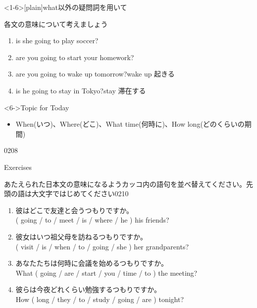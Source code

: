 \documentclass[aspectratio=169,xcolor={dvipsnames,table}]{beamer}
\newcommand{\liaison}{%
  \tikz[baseline=0pt] \draw (0,0) to[bend right=20] (0.2,0);%
}
\newcommand{\myaudio}[1]{\href{#1}{\faVolumeUp}}
\begin{document}
\begin{frame}<1-6>[plain]{what以外の疑問詞を用いて}

{\small 各文の意味について考えましょう}

\begin{enumerate}
 \item {} is she going to play soccer?
 \item {} are you going to start your homework?
 \item {} are you going to wake up tomorrow?\hfill{\scriptsize wake up \textipa{/w\'eIk\liaison \textturnv p/} 起きる}
 \item {} is he going to stay in Tokyo?\hfill{\scriptsize stay  滞在する}
\end{enumerate}

\begin{block}<6->{Topic for Today}
\small
\begin{itemize}[square]\small
 \item  When(いつ)、Where(どこ)、What time(何時に)、How long(どのくらいの期間)
\end{itemize}
      \end{block}
\hfill{\tiny 0208}\,{\scriptsize \myaudio{./audio/011_be_going_to_16.mp3}}
\end{frame}
\begin{frame}[plain]{Exercises}

{\small あたえられた日本文の意味になるようカッコ内の語句を並べ替えてください。先頭の語は大文字ではじめてください}\hfill{\tiny 0210}\,{\scriptsize \myaudio{./audio/011_be_going_to_16.mp3}}

 \begin{enumerate}
  \item {\small 彼はどこで友達と会うつもりですか。}\\
( going / to / meet / is / where / he ) his friends?\\
  \item {\small 彼女はいつ祖父母を訪ねるつもりですか。}\\
( visit / is / when / to / going / she ) her grandparents?\\
  \item {\small あなたたちは何時に会議を始めるつもりですか。}\\
What ( going / are / start / you / time / to ) the meeting?\\
  \item {\small 彼らは今夜どれくらい勉強するつもりですか。}\\
How ( long / they / to / study / going / are ) tonight?\\
 \end{enumerate}
\end{frame}
\end{document}
